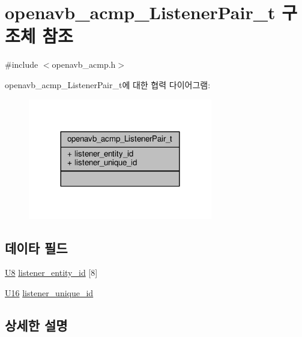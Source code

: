 \hypertarget{structopenavb__acmp___listener_pair__t}{}\section{openavb\+\_\+acmp\+\_\+\+Listener\+Pair\+\_\+t 구조체 참조}
\label{structopenavb__acmp___listener_pair__t}


{\ttfamily \#include $<$openavb\+\_\+acmp.\+h$>$}



openavb\+\_\+acmp\+\_\+\+Listener\+Pair\+\_\+t에 대한 협력 다이어그램\+:
\nopagebreak
\begin{figure}[H]
\begin{center}
\leavevmode
\includegraphics[width=228pt]{structopenavb__acmp___listener_pair__t__coll__graph}
\end{center}
\end{figure}
\subsection*{데이타 필드}
\begin{DoxyCompactItemize}
\item 
\hyperlink{openavb__types__base__pub_8h_aa63ef7b996d5487ce35a5a66601f3e73}{U8} \hyperlink{structopenavb__acmp___listener_pair__t_adc2799f499bfc317ee7d3a9182d1c71f}{listener\+\_\+entity\+\_\+id} \mbox{[}8\mbox{]}
\item 
\hyperlink{openavb__types__base__pub_8h_a0a0a322d5fa4a546d293a77ba8b4a71f}{U16} \hyperlink{structopenavb__acmp___listener_pair__t_adf094f0d101f97a77306253aa7c650e6}{listener\+\_\+unique\+\_\+id}
\end{DoxyCompactItemize}


\subsection{상세한 설명}


